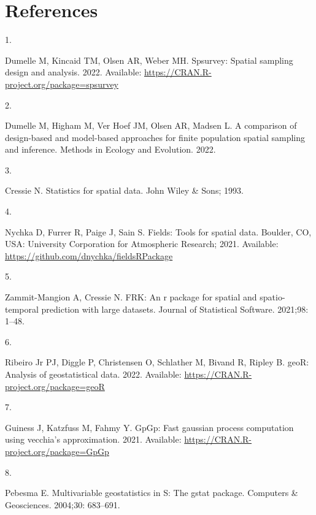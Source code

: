 \documentclass[10pt,letterpaper]{article}
\newlength{\cslhangindent}
\newlength{\csllabelwidth}
\newlength{\cslentryspacingunit} %
\newenvironment{CSLReferences}[2] %
 {%
  \setlength{\parindent}{0pt}
  \ifodd #1
  \let\oldpar\par
  \def\par{\hangindent=\cslhangindent\oldpar}
  \fi
  \setlength{\parskip}{#2\cslentryspacingunit}
 }%
 {}
\newcommand{\CSLLeftMargin}[1]{\parbox[t]{\csllabelwidth}{#1}}
\newcommand{\CSLRightInline}[1]{\parbox[t]{\linewidth - \csllabelwidth}{#1}\break}
\begin{document}
\hypertarget{references}{%
\section*{References}\label{references}}

\hypertarget{refs}{}
\begin{CSLReferences}{0}{0}
\leavevmode\hypertarget{ref-dumelle2022spsurvey}{}%
\CSLLeftMargin{1. }
\CSLRightInline{Dumelle M, Kincaid TM, Olsen AR, Weber MH. Spsurvey:
Spatial sampling design and analysis. 2022. Available:
\url{https://CRAN.R-project.org/package=spsurvey}}

\leavevmode\hypertarget{ref-dumelle2022comparison}{}%
\CSLLeftMargin{2. }
\CSLRightInline{Dumelle M, Higham M, Ver Hoef JM, Olsen AR, Madsen L. A
comparison of design-based and model-based approaches for finite
population spatial sampling and inference. Methods in Ecology and
Evolution. 2022. }

\leavevmode\hypertarget{ref-cressie1993statistics}{}%
\CSLLeftMargin{3. }
\CSLRightInline{Cressie N. Statistics for spatial data. John Wiley \&
Sons; 1993. }

\leavevmode\hypertarget{ref-nychka2021fields}{}%
\CSLLeftMargin{4. }
\CSLRightInline{Nychka D, Furrer R, Paige J, Sain S. Fields: Tools for
spatial data. Boulder, CO, USA: University Corporation for Atmospheric
Research; 2021. Available:
\url{https://github.com/dnychka/fieldsRPackage}}

\leavevmode\hypertarget{ref-zammitmangion2021FRK}{}%
\CSLLeftMargin{5. }
\CSLRightInline{Zammit-Mangion A, Cressie N. FRK: An r package for
spatial and spatio-temporal prediction with large datasets. Journal of
Statistical Software. 2021;98: 1--48. }

\leavevmode\hypertarget{ref-ribiero2022geoR}{}%
\CSLLeftMargin{6. }
\CSLRightInline{Ribeiro Jr PJ, Diggle P, Christensen O, Schlather M,
Bivand R, Ripley B. geoR: Analysis of geostatistical data. 2022.
Available: \url{https://CRAN.R-project.org/package=geoR}}

\leavevmode\hypertarget{ref-guiness2021gpgp}{}%
\CSLLeftMargin{7. }
\CSLRightInline{Guiness J, Katzfuss M, Fahmy Y. GpGp: Fast gaussian
process computation using vecchia's approximation. 2021. Available:
\url{https://CRAN.R-project.org/package=GpGp}}

\leavevmode\hypertarget{ref-pebesma2004gstat}{}%
\CSLLeftMargin{8. }
\CSLRightInline{Pebesma E. Multivariable geostatistics in {S}: The gstat
package. Computers \& Geosciences. 2004;30: 683--691. }


\end{CSLReferences}
\end{document}
